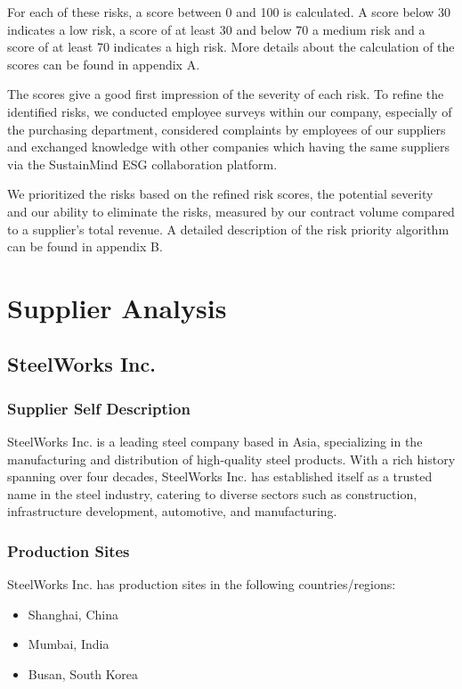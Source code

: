 \documentclass{article}
\begin{document}
For each of these risks, a score between 0 and 100 is calculated. A score below 30 indicates a low risk, a score of at least 30 and below 70 a medium risk and
a score of at least 70 indicates a high risk. More details about the calculation of the scores can be found in appendix A.

The scores give a good first impression of the severity of each risk. To refine the identified risks, we conducted employee surveys within our company, especially
of the purchasing department, considered complaints by employees of our suppliers and exchanged knowledge with other companies which having the same suppliers via the
SustainMind ESG collaboration platform.

We prioritized the risks based on the refined risk scores, the potential severity and our ability to eliminate the risks, measured by our contract volume compared to
a supplier's total revenue. A detailed description of the risk priority algorithm can be found in appendix B.

\section{Supplier Analysis}

\subsection{SteelWorks Inc.}

\subsubsection*{Supplier Self Description}
SteelWorks Inc. is a leading steel company based in Asia, specializing in the manufacturing and distribution of high-quality steel products.
With a rich history spanning over four decades, SteelWorks Inc. has established itself as a trusted name in the steel industry, catering to diverse sectors
such as construction, infrastructure development, automotive, and manufacturing.

\subsubsection*{Production Sites}
SteelWorks Inc. has production sites in the following countries/regions:
\begin{itemize}
    \item Shanghai, China
    \item Mumbai, India
    \item Busan, South Korea
\end{itemize}
\end{document}
